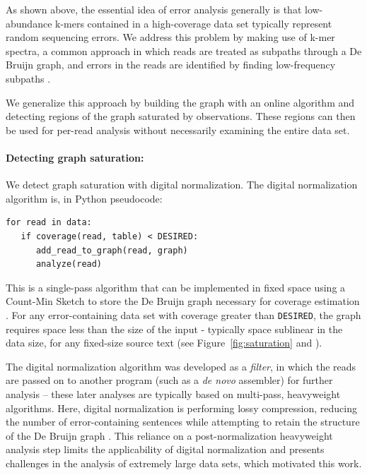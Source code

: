 As shown above, the essential idea of error analysis generally is that low-abundance
k-mers contained in a high-coverage data set typically represent
random sequencing errors. We address this problem by making use of k-mer spectra, a common
approach in which reads are treated as subpaths through a De
Bruijn graph, and errors in the reads are identified by finding
low-frequency subpaths \cite{Pevzner2001}.  


We generalize this approach by
building the graph with an online algorithm and detecting regions of
the graph saturated by observations.  These regions can then be used
for per-read analysis without necessarily examining the entire data
set.


\paragraph*{Detecting graph saturation:}
We detect graph saturation with digital normalization. The digital
normalization algorithm is, in Python pseudocode:
\begin{verbatim}
for read in data:
   if coverage(read, table) < DESIRED:
      add_read_to_graph(read, graph)
      analyze(read)
\end{verbatim}
This is a single-pass algorithm that can be implemented in fixed space
using a Count-Min Sketch to store the De Bruijn graph necessary for
coverage estimation \cite{Pell2012, Zhang2014}.  For any
error-containing data set with coverage greater than {\tt DESIRED},
the graph requires space less than the size of the input - typically
space sublinear in the data size, for any fixed-size source text (see
Figure~\ref{fig:saturation} and \cite{Zhang2014}).

The digital normalization algorithm was developed as a {\em filter},
in which the reads are passed on to another program (such as a {\em
  de novo} assembler) for further analysis -- these later analyses are
typically based on multi-pass, heavyweight algorithms.  Here, digital
normalization is performing lossy compression, reducing the number of
error-containing sentences while attempting to retain the structure of
the De Bruijn graph \cite{Brown2012, Zhang2014, Lowe2015}.  This reliance
on a post-normalization heavyweight analysis step limits the
applicability of digital normalization and presents challenges in the
analysis of extremely large data sets, which motivated this work.

